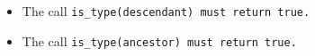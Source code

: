 \begin{itemize}

\item The call \tt{is_type(descendant)} must return \tt{true}.

\item The call \tt{is_type(ancestor)}   must return \tt{true}.

\end{itemize}
